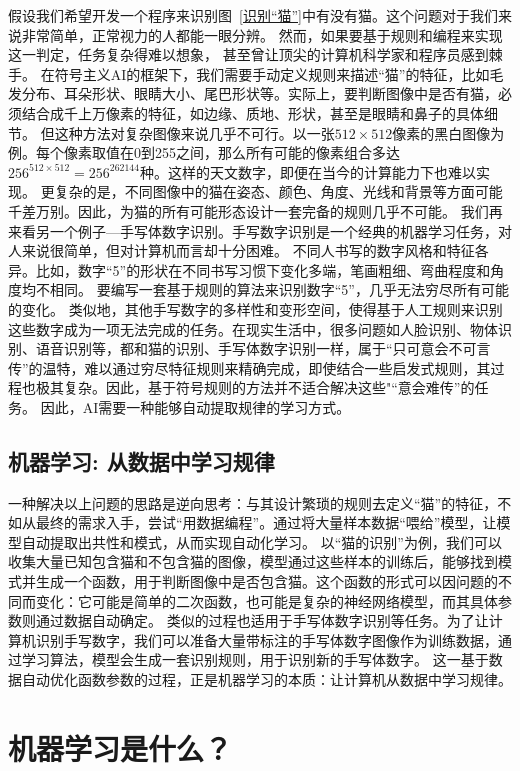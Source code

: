 假设我们希望开发一个程序来识别图~\ref{识别“猫”}中有没有猫。这个问题对于我们来说非常简单，正常视力的人都能一眼分辨。
然而，如果要基于规则和编程来实现这一判定，任务复杂得难以想象， 甚至曾让顶尖的计算机科学家和程序员感到棘手。
在符号主义AI的框架下，我们需要手动定义规则来描述“猫”的特征，比如毛发分布、耳朵形状、眼睛大小、尾巴形状等。实际上，要判断图像中是否有猫，必须结合成千上万像素的特征，如边缘、质地、形状，甚至是眼睛和鼻子的具体细节。
但这种方法对复杂图像来说几乎不可行。以一张$512 \times 512$像素的黑白图像为例。每个像素取值在0到255之间，那么所有可能的像素组合多达$256^{512\times 512}=256^{262144}$种。这样的天文数字，即便在当今的计算能力下也难以实现。
更复杂的是，不同图像中的猫在姿态、颜色、角度、光线和背景等方面可能千差万别。因此，为猫的所有可能形态设计一套完备的规则几乎不可能。
我们再来看另一个例子---手写体数字识别。手写数字识别\cite{lecun1989backpropagation}是一个经典的机器学习任务，对人来说很简单，但对计算机而言却十分困难。
不同人书写的数字风格和特征各异。比如，数字“5”的形状在不同书写习惯下变化多端，笔画粗细、弯曲程度和角度均不相同。
要编写一套基于规则的算法来识别数字“5”，几乎无法穷尽所有可能的变化。
类似地，其他手写数字的多样性和变形空间，使得基于人工规则来识别这些数字成为一项无法完成的任务。在现实生活中，很多问题如人脸识别、物体识别、语音识别等，都和猫的识别、手写体数字识别一样，属于“只可意会不可言传”的温特，难以通过穷尽特征规则来精确完成，即使结合一些启发式规则，其过程也极其复杂。因此，基于符号规则的方法并不适合解决这些"“意会难传”的任务。
因此，AI需要一种能够自动提取规律的学习方式。



\subsection{机器学习: 从数据中学习规律}

一种解决以上问题的思路是逆向思考：与其设计繁琐的规则去定义“猫”的特征，不如从最终的需求入手，尝试“用数据编程”。通过将大量样本数据“喂给”模型，让模型自动提取出共性和模式，从而实现自动化学习。
以“猫的识别”为例，我们可以收集大量已知包含猫和不包含猫的图像，模型通过这些样本的训练后，能够找到模式并生成一个函数，用于判断图像中是否包含猫。这个函数的形式可以因问题的不同而变化：它可能是简单的二次函数，也可能是复杂的神经网络模型，而其具体参数则通过数据自动确定。
类似的过程也适用于手写体数字识别等任务。为了让计算机识别手写数字，我们可以准备大量带标注的手写体数字图像作为训练数据，通过学习算法，模型会生成一套识别规则，用于识别新的手写体数字。
这一基于数据自动优化函数参数的过程，正是机器学习的本质：让计算机从数据中学习规律。\section{机器学习是什么？}\label{sec:机器学习}

